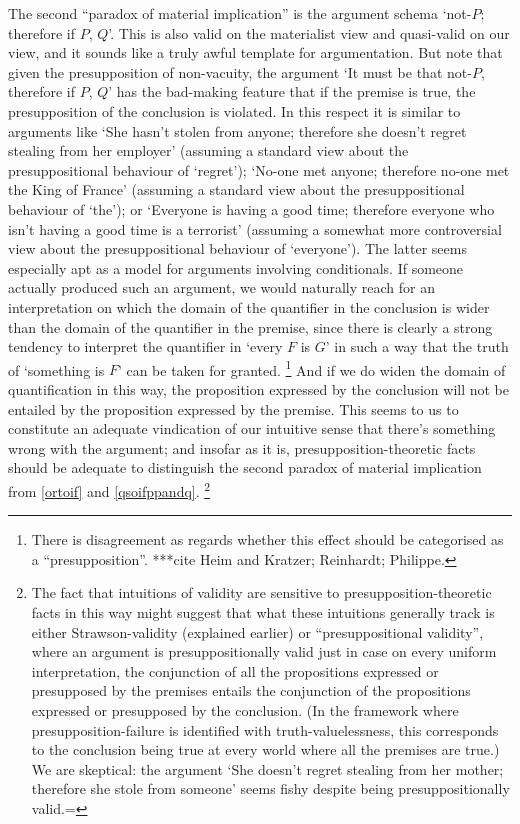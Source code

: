 \documentclass[If.tex]{subfiles}
\begin{document}
The second “paradox of material implication” is the argument schema ‘not-$P$; therefore if $P$, $Q$’. This is also valid on the materialist view and quasi-valid on our view, and it sounds like a truly awful template for argumentation. But note that given the presupposition of non-vacuity, the argument ‘It must be that not-$P$, therefore if $P$, $Q$’ has the bad-making feature that if the premise is true, the presupposition of the conclusion is violated. In this respect it is similar to arguments like ‘She hasn't stolen from anyone; therefore she doesn't regret stealing from her employer’ (assuming a standard view about the presuppositional behaviour of ‘regret’); ‘No-one met anyone; therefore no-one met the King of France’ (assuming a standard view about the presuppositional behaviour of ‘the’); or ‘Everyone is having a good time; therefore everyone who isn't having a good time is a terrorist’ (assuming a somewhat more controversial view about the presuppositional behaviour of ‘everyone’). The latter seems especially apt as a model for arguments involving conditionals.  If someone actually produced such an argument, we would naturally reach for an interpretation on which the domain of the quantifier in the conclusion is wider than the domain of the quantifier in the premise, since there is clearly a strong tendency to interpret the quantifier in ‘every $F$ is $G$’ in such a way that the truth of ‘something is $F$’ can be taken for granted.%
\footnote{There is disagreement as regards whether this effect should be categorised as a “presupposition”.  ***cite Heim and Kratzer; Reinhardt; Philippe.  }
And if we do widen the domain of quantification in this way, the proposition expressed by the conclusion will not be entailed by the proposition expressed by the premise.  This seems to us to constitute an adequate vindication of our intuitive sense that there's something wrong with the argument; and insofar as it is, presupposition-theoretic facts should be adequate to distinguish the second paradox of material implication from \ref{ortoif} and \ref{qsoifppandq}.%
\footnote{The fact that intuitions of validity are sensitive to presupposition-theoretic facts in this way might suggest that what these intuitions generally track is either Strawson-validity (explained earlier) or “presuppositional validity”, where an argument is presuppositionally valid just in case on every uniform interpretation, the conjunction of all the propositions expressed or presupposed by the premises entails the conjunction of the propositions expressed or presupposed by the conclusion.  (In the framework where presupposition-failure is identified with truth-valuelessness, this corresponds to the conclusion being true at every world where all the premises are true.)  We are skeptical: the argument ‘She doesn't regret stealing from her mother; therefore she stole from someone’ seems fishy despite being presuppositionally valid.=}  
\end{document}
